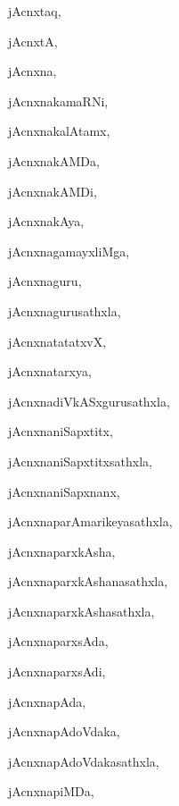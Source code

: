 \begin{multicols}{3}
{\noindent
{jAcnxtaq}, \pageref{jAcnxtaq}

\noindent
{jAcnxtA}, \pageref{jAcnxtA}

\noindent
{jAcnxna}, \pageref{jAcnxna}

\noindent
{jAcnxnakamaRNi}, \pageref{jAcnxnakamaRNi}

\noindent
{jAcnxnakalAtamx}, \pageref{jAcnxnakalAtamx}

\noindent
{jAcnxnakAMDa}, \pageref{jAcnxnakAMDa}

\noindent
{jAcnxnakAMDi}, \pageref{jAcnxnakAMDi}

\noindent
{jAcnxnakAya}, \pageref{jAcnxnakAya}

\noindent
{jAcnxnagamayxliMga}, \pageref{jAcnxnagamayxliMga}

\noindent
{jAcnxnaguru}, \pageref{jAcnxnaguru}

\noindent
{jAcnxnagurusathxla}, \pageref{jAcnxnagurusathxla}

\noindent
{jAcnxnatatatxvX}, \pageref{jAcnxnatatatxvX}

\noindent
{jAcnxnatarxya}, \pageref{jAcnxnatarxya}

\noindent
{jAcnxnadiVkASxgurusathxla}, \pageref{jAcnxnadiVkASxgurusathxla}

\noindent
{jAcnxnaniSapxtitx}, \pageref{jAcnxnaniSapxtitx}

\noindent
{jAcnxnaniSapxtitxsathxla}, \pageref{jAcnxnaniSapxtitxsathxla}

\noindent
{jAcnxnaniSapxnanx}, \pageref{jAcnxnaniSapxnanx}

\noindent
{jAcnxnaparAmarikeyasathxla}, \pageref{jAcnxnaparAmarikeyasathxla}

\noindent
{jAcnxnaparxkAsha}, \pageref{jAcnxnaparxkAsha}

\noindent
{jAcnxnaparxkAshanasathxla}, \pageref{jAcnxnaparxkAshanasathxla}

\noindent
{jAcnxnaparxkAshasathxla}, \pageref{jAcnxnaparxkAshasathxla}

\noindent
{jAcnxnaparxsAda}, \pageref{jAcnxnaparxsAda}

\noindent
{jAcnxnaparxsAdi}, \pageref{jAcnxnaparxsAdi}

\noindent
{jAcnxnapAda}, \pageref{jAcnxnapAda}

\noindent
{jAcnxnapAdoVdaka}, \pageref{jAcnxnapAdoVdaka}

\noindent
{jAcnxnapAdoVdakasathxla}, \pageref{jAcnxnapAdoVdakasathxla}

\noindent
{jAcnxnapiMDa}, \pageref{jAcnxnapiMDa}

}
\end{multicols}
